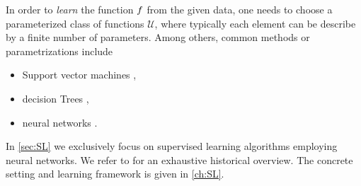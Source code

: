 In order to \emph{learn} the function $f$ from the given data, one needs to choose a parameterized class of functions $\mathcal{U}$, where typically each element can be describe by a finite number of parameters. Among others, common methods or parametrizations include
%
\begin{itemize}
\item Support vector machines \cite{cortes1995support, scholkopf2005support},
\item decision Trees \cite{morgan1963problems, Brei},
\item neural networks \cite{Turing,rosenblatt1958perceptron, minsky1969introduction}.
\end{itemize}
%
In \cref{sec:SL} we exclusively focus on supervised learning algorithms employing neural networks. We refer to \cite{SCHMIDHUBER201585} for an exhaustive historical overview. The concrete setting and learning framework is given in \cref{ch:SL}.
%
%
%

